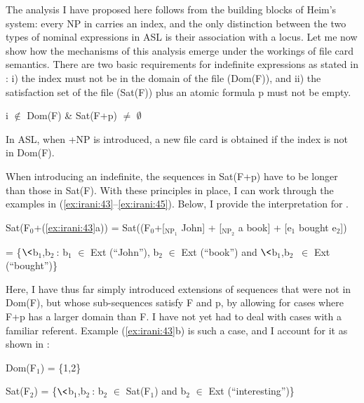 \documentclass[output=paper,
modfonts
]{langscibook}
\begin{document}
The analysis I have proposed here follows from the building blocks of Heim's system: every NP in  carries an index, and the only distinction between the two types of nominal expressions in ASL is their association with a locus. Let me now show how the mechanisms of this analysis emerge under the workings of file card semantics. There are two basic requirements for indefinite expressions as stated in : i) the index must not be in the domain of the file (Dom(F)), and ii) the satisfaction set of the file (Sat(F)) plus an atomic formula p must not be empty. 

\begin{exe}
\ex \label{ex:irani:47} i \(\notin\) Dom(F) \& Sat(F+p) \(\neq\) \(\emptyset\)
\end{exe}

In ASL, when +NP is introduced, a new file card is obtained if the index is not in Dom(F). 

When introducing an indefinite, the sequences in Sat(F+p) have to be longer than those in Sat(F). With these principles in place, I can work through the examples in (\ref{ex:irani:43}--\ref{ex:irani:45}). Below, I provide the interpretation for .

\begin{exe}

\ex Sat(F$_0$+(\ref{ex:irani:43}a)) = Sat((F$_0$+[$_{\text{NP}_{1}}$ John] + [$_{\text{NP}_{2}}$ a book] + [e$_1$ bought e$_2$])\par 
= \{$\<$b$_1$,b$_2\>$: b$_1$ \(\in\) Ext (``John''), b$_2$ \(\in\) Ext (``book'') and $\<$b$_1$,b$_2\>$ \(\in\) Ext (``bought'')\} \par 

\end{exe}

Here, I have thus far simply introduced extensions of sequences that were not in Dom(F), but whose sub-sequences satisfy F and p, by allowing for cases where F+p has a larger domain than F. I have not yet had to deal with cases with a familiar referent. Example (\ref{ex:irani:43}b) is such a case, and I account for it as shown in : 

\begin{exe}

\ex  \label{ex:irani:49} Dom(F$_1$) = \{1,2\} \par 
Sat(F$_2$) = \{$\<$b$_1$,b$_2\>$: b$_2$ \(\in\) Sat(F$_1$) and b$_2$ \(\in\) Ext (``interesting'')\} \par 

\end{exe}
\end{document}
